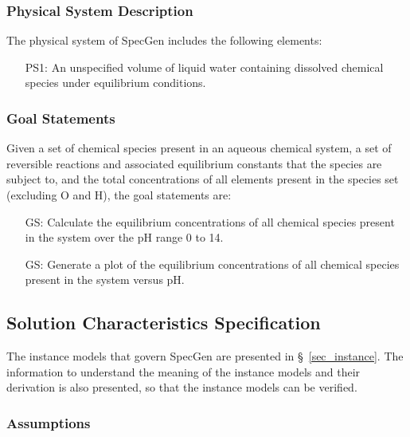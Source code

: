 \documentclass[12pt]{article}
\newcounter{goalnum} %
\newcommand{\sref}[1]{\S~\ref{#1}}
\newcommand{\progname}{SpecGen} %
\begin{document}
\subsubsection{Physical System Description}

The physical system of \progname{} includes the following elements:
\begin{itemize}

\item[PS1:] An unspecified volume of liquid water containing dissolved chemical species under equilibrium conditions.

\end{itemize}


\subsubsection{Goal Statements}

\noindent Given a set of chemical species present in an aqueous chemical system, a set of reversible reactions and associated equilibrium constants that the species are subject to, and the total concentrations of all elements present in the species set (excluding O and H), the goal statements are:

\begin{itemize}

\item[GS\refstepcounter{goalnum}\thegoalnum \label{G_solve}:] Calculate the equilibrium concentrations of all chemical species present in the system over the pH range 0 to 14.
\item[GS\refstepcounter{goalnum}\thegoalnum \label{G_plot}:] Generate a plot of the equilibrium concentrations of all chemical species present in the system versus pH.
\end{itemize}

\subsection{Solution Characteristics Specification}

The instance models that govern \progname{} are presented in
\sref{sec_instance}.  The information to understand the meaning of the
instance models and their derivation is also presented, so that the instance
models can be verified.

\subsubsection{Assumptions}
\end{document}
